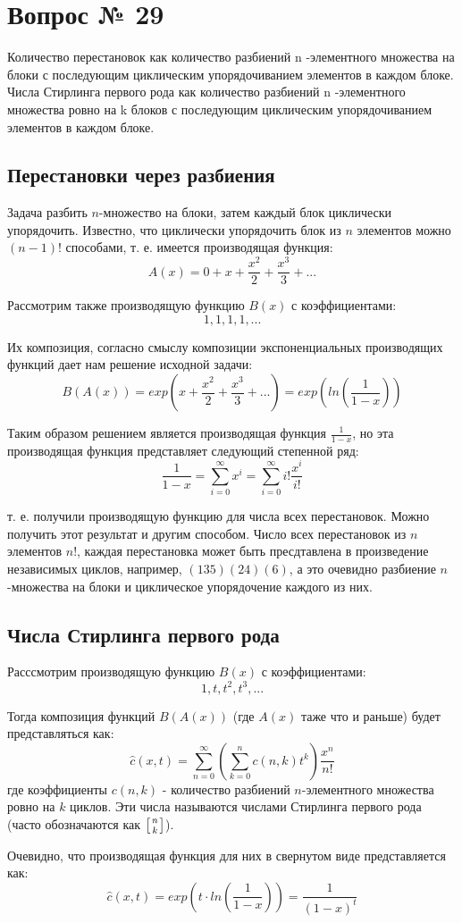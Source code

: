 \chapter{Вопрос № 29}

Количество перестановок как количество разбиений n -элементного множества на блоки с последующим циклическим упорядочиванием элементов в каждом блоке. Числа Стирлинга первого рода как количество разбиений n -элементного множества ровно на k блоков с последующим циклическим упорядочиванием элементов в каждом блоке.

\section{Перестановки через разбиения}

Задача разбить $n$-множество на блоки, затем каждый блок циклически упорядочить. Известно, что циклически упорядочить блок из $n$ элементов можно $\left(n-1\right)!$ способами, т. е. имеется производящая функция:
\[
	A\left(x\right) = 0 + x + \frac{x^2}{2} + \frac{x^3}{3} + ...
\]

Рассмотрим также производящую функцию $B\left(x\right)$ с коэффициентами:
\[
	1, 1, 1, 1, ...
\]

Их композиция, согласно смыслу композиции экспоненциальных производящих функций дает нам решение исходной задачи:
\[
	B\left(A\left(x\right)\right) = exp\left(x + \frac{x^2}{2} + \frac{x^3}{3} + ... \right) = exp\left(ln\left(\frac{1}{1-x}\right)\right)
\]

Таким образом решением является производящая функция $\frac{1}{1 - x}$, но эта производящая функция представляет следующий степенной ряд:
\[
	\frac{1}{1 - x} = \sum_{i=0}^{\infty} x^i = \sum_{i=0}^{\infty}i!\frac{x^i}{i!}
\]

т. е. получили производящую функцию для числа всех перестановок. Можно получить этот результат и другим способом. Число всех перестановок из $n$ элементов $n!$, каждая перестановка может быть пресдтавлена в произведение независимых циклов, например, $\left(1 3 5\right)\left(2 4\right)\left(6\right)$, а это очевидно разбиение $n$-множества на блоки и циклическое упорядочение каждого из них.

\section{Числа Стирлинга первого рода}

Расссмотрим производящую функцию $B\left(x\right)$ с коэффициентами:
\[
	1, t, t^2, t^3, ...
\]

Тогда композиция функций $B\left(A\left(x\right)\right)$ (где $A\left(x\right)$ таже что и раньше) будет представляться как:
\[
	\hat c\left(x,t\right) = \sum_{n=0}^{\infty}\left(\sum_{k=0}^n c\left(n,k\right) t^k\right) \frac{x^n}{n!}
\]
где коэффициенты $c\left(n,k\right)$ - количество разбиений $n$-элементного множества ровно на $k$ циклов. Эти числа называются числами Стирлинга первого рода (часто обозначаются как $\left[n \atop k\right]$).

Очевидно, что производящая функция для них в свернутом виде представляется как:
\[
	\hat c\left(x,t\right) = exp\left(t\cdot ln\left(\frac{1}{1-x}\right)\right) = \frac{1}{\left(1-x\right)^t}
\]